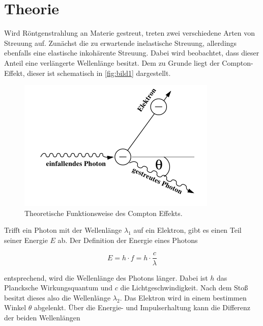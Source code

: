 \section{Theorie}
\label{sec:Theorie}

Wird Röntgenstrahlung an Materie gestreut, treten zwei verschiedene Arten von Streuung auf.
Zunächst die zu erwartende inelastische Streuung, allerdings ebenfalls eine elastische inkohärente Streuung.
Dabei wird beobachtet, dass dieser Anteil eine verlängerte Wellenlänge besitzt.
Dem zu Grunde liegt der Compton-Effekt, dieser ist schematisch in \autoref{fig:bild1} dargestellt.

\begin{figure}
    \centering
    \includegraphics[width=\textwidth/2]{images/bild1.png}
    \caption{Theoretische Funktionsweise des Compton Effekts. \cite{V603}}
    \label{fig:bild1}
\end{figure}

Trifft ein Photon mit der Wellenlänge $\lambda _1$ auf ein Elektron, gibt es einen Teil seiner Energie $E$ ab.
Der Definition der Energie eines Photons

\begin{equation}
    E = h \cdot f = h \cdot \frac{c}{\lambda}
    \label{eq:energie}
\end{equation}

entsprechend, wird die Wellenlänge des Photons länger.
Dabei ist $h$ das Plancksche Wirkungsquantum und $c$ die Lichtgeschwindigkeit.
Nach dem Stoß besitzt dieses also die Wellenlänge $\lambda _2$.
Das Elektron wird in einem bestimmen Winkel $\theta$ abgelenkt.
Über die Energie- und Impulserhaltung kann die Differenz der beiden Wellenlängen 

